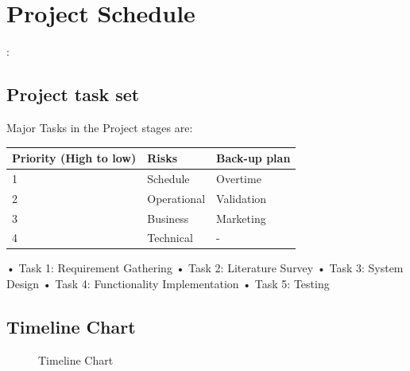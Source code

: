 \documentclass[oneside,a4paper,12pt]{report}
\begin{document}
{\newpage
\section{Project Schedule}:
\subsection{Project task set}
Major Tasks in the Project stages are:
\newline

\def\arraystretch{1.5}
  \begin{tabular}{| p{3cm} | p{3cm} |p{3cm}|}
\hline
\textbf{Priority (High to low)}	&\textbf{Risks}	&\textbf{Back-up plan}	 \\ \hline  
1	&Schedule	&Overtime	    \\ \hline 
2	&Operational	&Validation	   \\ \hline  
3	&Business	&Marketing	    \\ \hline 
4	&Technical	&-	  \\ \hline 
\end{tabular}
\newline\newline\newline
•	Task 1: Requirement Gathering\newline
•	Task 2: Literature Survey\newline
•	Task 3: System Design\newline
•	Task 4: Functionality Implementation\newline
•	Task 5: Testing


\newpage
\subsection{Timeline Chart}
\begin{center}
	\begin{figure}[!htbp]
	
		  \caption{Timeline Chart}
	 

\end{figure}
\end{center}}
\end{document}

